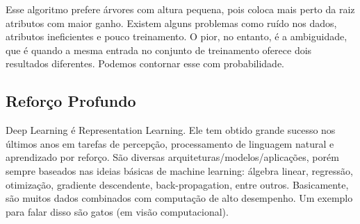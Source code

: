 \documentclass[12pt,letterpaper]{article}
\begin{document}
	Esse algoritmo prefere árvores com altura pequena, pois coloca mais perto da raiz atributos com maior ganho. Existem alguns problemas como ruído nos dados, atributos ineficientes e pouco treinamento. O pior, no entanto, é a ambiguidade, que é quando a mesma entrada no conjunto de treinamento oferece dois resultados diferentes. Podemos contornar esse com probabilidade.
	
	\subsection*{Reforço Profundo}
	
	Deep Learning é Representation Learning. Ele tem obtido grande sucesso nos últimos anos em tarefas de percepção, processamento de linguagem natural e aprendizado por reforço. São diversas arquiteturas/modelos/aplicações, porém sempre baseados nas ideias básicas de machine learning: álgebra linear, regressão, otimização, gradiente descendente, back-propagation, entre outros. Basicamente, são muitos dados combinados com computação de alto desempenho. Um exemplo para falar disso são gatos (em visão computacional).
	
\end{document}
